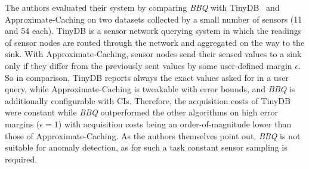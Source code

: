 The authors evaluated their system by comparing \textit{BBQ} with
TinyDB~\cite{madden2005tinydb} and Approximate-Caching on two datasets
collected by a small number of sensors (11 and 54 each). TinyDB is a sensor network
querying system in which the readings of sensor nodes are routed through the
network and aggregated on the way to the sink. With Approximate-Caching, sensor
nodes send their sensed values to a sink only if they differ from the previously
sent values by some user-defined margin $ \epsilon $. So in comparison, TinyDB
reports always the exact values asked for in a user query, while
Approximate-Caching is tweakable with error bounds, and \textit{BBQ} is
additionally configurable with \acp{CI}. Therefore, the acquisition costs of
TinyDB were constant while \textit{BBQ} outperformed the other algorithms on
high error margins ($ \epsilon = 1 $) with acquisition costs being an
order-of-magnitude lower than those of Approximate-Caching. As the authors
themselves point out, \textit{BBQ} is not suitable for anomaly detection, as
for such a task constant sensor sampling is required.

